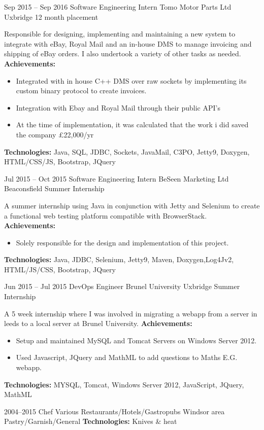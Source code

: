 \cventry
{Sep 2015 -- Sep 2016}
{Software Engineering Intern}
{Tomo Motor Parts Ltd}
{Uxbridge}
{12 month placement}{
    Responsible for designing, implementing and maintaining a new system to
    integrate with eBay, Royal Mail and an in-house DMS to manage invoicing and
    shipping of eBay orders. I also undertook a variety of other tasks as needed.
    \newline{}
    \textbf{Achievements:}{
        \begin{itemize}
		    \item{
                Integrated with in house C++ DMS over raw sockets by implementing
                its custom binary protocol to create invoices.
            }
            \item{
                Integration with Ebay and Royal Mail through their public API's
            }
		    \item{
                At the time of implementation, it was calculated that the work i
                did saved the company \pounds22,000/yr
            }
        \end{itemize}
    }
    \textbf{Technologies:}{
        \scriptsize 
                Java, SQL, JDBC, Sockets, JavaMail, C3PO, Jetty9, Doxygen, 
                HTML/CSS/JS, Bootstrap, JQuery
        \newline{} 
    }
}


\cventry
{Jul 2015 -- Oct 2015}
{Software Engineering Intern}
{BeSeen Marketing Ltd}
{Beaconsfield}
{Summer Internship}{
    A summer internship using Java in conjunction with Jetty and Selenium to 
    create a functional web testing platform compatible with BrowserStack.
    \newline{}
    \textbf{Achievements:}{
        \begin{itemize}
		    \item{
                Solely responsible for the design and implementation of this
                project.
            }
	    \end{itemize}
    }
    \textbf{Technologies:}{
        \scriptsize
            Java, JDBC, Selenium, Jetty9, Maven, Doxygen,Log4Jv2, HTML/JS/CSS,
            Bootstrap, JQuery
        \newline{} 
    }
}

\cventry
{Jun 2015 -- Jul 2015}
{DevOps Engineer}
{Brunel University}
{Uxbridge}
{Summer Internship}{
    A 5 week internship where I was involved in migrating a webapp
    from a server in leeds to a local server at Brunel University. \newline{}
    \textbf{Achievements:}{
        \begin{itemize}
		    \item{
                Setup and maintained MySQL and Tomcat Servers on Windows Server
                2012.
            }
		    \item{
                Used Javascript, JQuery and MathML to add questions to Maths E.G.
                webapp.
            }
	    \end{itemize}
    }
    \textbf{Technologies:}{
        \scriptsize
            MYSQL, Tomcat, Windows Server 2012, JavaScript, JQuery, MathML
        \newline{}
    }
}

\cventry
{2004--2015}
{Chef}
{Various Restaurants/Hotels/Gastropubs}
{Windsor area}
{Pastry/Garnish/General}{
    \textbf{Technologies:}{
        \scriptsize 
            Knives \& heat 
        \newline{}
    }
}

